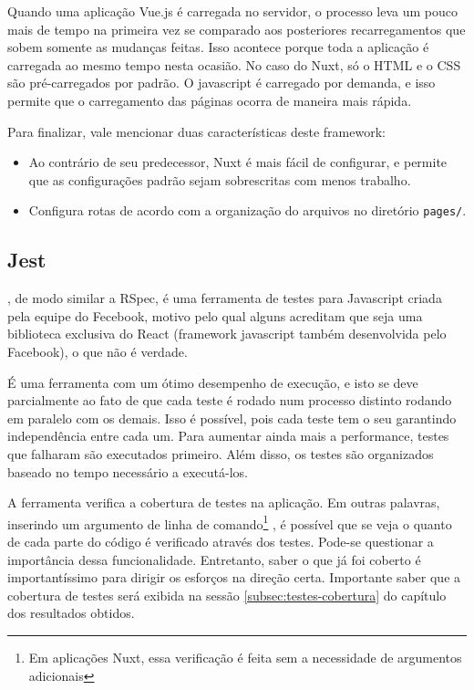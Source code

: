 Quando uma aplicação Vue.js é carregada no servidor, o processo leva um pouco mais de tempo na primeira
vez se comparado aos posteriores recarregamentos que sobem somente as mudanças feitas. Isso acontece
porque toda a aplicação é carregada ao mesmo tempo nesta ocasião. No caso do Nuxt, só o HTML e o CSS
são pré-carregados por padrão. O javascript é carregado por demanda, e isso permite que o carregamento
das páginas ocorra de maneira mais rápida.

Para finalizar, vale mencionar duas características deste framework:
\begin{itemize}
    \item Ao contrário de seu predecessor, Nuxt é mais fácil de configurar, e permite que as configurações
    padrão sejam sobrescritas com menos trabalho.
    \item Configura rotas de acordo com a organização do arquivos no diretório \texttt{pages/}.
\end{itemize}

\subsection{Jest}\label{subsec:jest}

, de modo similar a RSpec, é uma ferramenta de testes para Javascript criada pela equipe do Fecebook,
motivo pelo qual alguns acreditam que seja uma biblioteca exclusiva do React (framework javascript também
desenvolvida pelo Facebook), o que não é verdade.

É uma ferramenta com um ótimo desempenho de execução, e isto se deve parcialmente ao fato de que cada teste
é rodado num processo distinto rodando em paralelo com os demais. Isso é possível, pois cada teste tem o seu
 garantindo independência entre cada um. Para aumentar ainda mais a performance, testes
que falharam são executados primeiro. Além disso, os testes são organizados baseado no tempo necessário a
executá-los.

A ferramenta verifica a cobertura de testes na aplicação. Em outras palavras, inserindo um argumento de linha
de comando\footnote{Em aplicações Nuxt, essa verificação é feita sem a necessidade de argumentos adicionais}
\texttt{}, é possível que se veja o quanto de cada parte do código é verificado através dos
testes. Pode-se questionar a importância dessa funcionalidade. Entretanto, saber o que já foi coberto é
importantíssimo para dirigir os esforços na direção certa. Importante saber que a cobertura de testes será
exibida na sessão \ref{subsec:testes-cobertura} do capítulo dos resultados obtidos.

